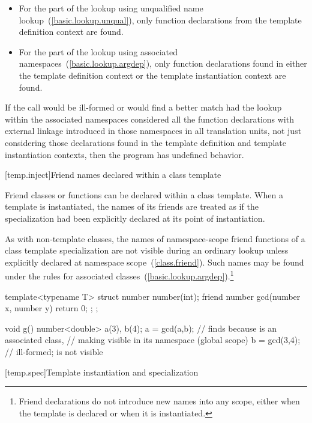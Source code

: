 \begin{itemize}
\item
For the part of the lookup using unqualified name lookup~(\ref{basic.lookup.unqual}),
only function declarations
from the template definition context are found.
\item
For the part of the lookup using associated namespaces~(\ref{basic.lookup.argdep}),
only function declarations found in either the template
definition context or the template instantiation context are found.
\end{itemize}

If
the call would be ill-formed or would find a better match had the lookup
within the associated namespaces considered all the function declarations with
external linkage introduced in those namespaces in all translation units,
not just considering those declarations found in the template definition and
template instantiation contexts, then the program has undefined behavior.

[temp.inject]{Friend names declared within a class template}

\pnum
Friend classes or functions can be declared within a class template.
When a template is instantiated, the names of its friends are treated
as if the specialization had been explicitly declared at its point of
instantiation.

\pnum
As with non-template classes, the names of namespace-scope friend
functions of a class template specialization are not visible during
an ordinary lookup unless explicitly declared at namespace scope~(\ref{class.friend}).
Such names may be found under the rules for associated
classes~(\ref{basic.lookup.argdep}).\footnote{Friend declarations do not
introduce new names into any scope, either
when the template is declared or when it is instantiated.}
\begin{example}
\begin{codeblock}
template<typename T> struct number {
  number(int);
  friend number gcd(number x, number y) { return 0; };
};

void g() {
  number<double> a(3), b(4);
  a = gcd(a,b);     // finds  because  is an associated class,
                    // making  visible in its namespace (global scope)
  b = gcd(3,4);     // ill-formed;  is not visible
}
\end{codeblock}
\end{example}

[temp.spec]{Template instantiation and specialization}

